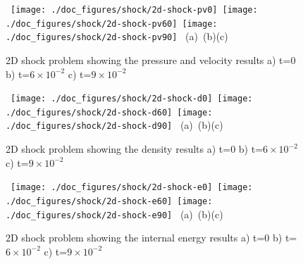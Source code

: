 \begin{figure}[H]
\vbox{
\hbox{
\hspace{-1.cm}
\texttt{[image: ./doc\_figures/shock/2d-shock-pv0]}
\hspace{-1.cm}
\texttt{[image: ./doc\_figures/shock/2d-shock-pv60]}
\hspace{-1.cm}
\texttt{[image: ./doc\_figures/shock/2d-shock-pv90]}
}
\vspace{-0.cm}
\hbox{\hspace{4.cm}(a) \hspace{4.5cm}(b)\hspace{4.5cm}(c)}
\vspace{-0.cm}}
\label{2d-pressure-vel}
\caption{ 2D shock problem showing the pressure and velocity results a) 
t=0 b) t=$6\times 10^{-2}$ c) t=$9\times 10^{-2}$ }
\end{figure}


\begin{figure}[H]
\vbox{
\hbox{
\hspace{-1.cm}
\texttt{[image: ./doc\_figures/shock/2d-shock-d0]}
\hspace{-1.cm}
\texttt{[image: ./doc\_figures/shock/2d-shock-d60]}
\hspace{-1.cm}
\texttt{[image: ./doc\_figures/shock/2d-shock-d90]}
}
\vspace{-0.cm}
\hbox{\hspace{4.cm}(a) \hspace{4.5cm}(b)\hspace{4.5cm}(c)}
\vspace{-0.cm}}
\label{2d-density-mesh}
\caption{ 2D shock problem showing the density results a) 
t=0 b) t=$6\times 10^{-2}$ c) t=$9\times 10^{-2}$ }
\end{figure}


\begin{figure}[H]
\vbox{
\hbox{
\hspace{-1.cm}
\texttt{[image: ./doc\_figures/shock/2d-shock-e0]}
\hspace{-1.cm}
\texttt{[image: ./doc\_figures/shock/2d-shock-e60]}
\hspace{-1.cm}
\texttt{[image: ./doc\_figures/shock/2d-shock-e90]}
}
\vspace{-0.cm}
\hbox{\hspace{4.cm}(a) \hspace{4.5cm}(b)\hspace{4.5cm}(c)}
\vspace{-0.cm}}
\label{2d-internal-energy-mesh}
\caption{ 2D shock problem showing the internal energy results a) 
t=0 b) t=$6\times 10^{-2}$ c) t=$9\times 10^{-2}$ }
\end{figure}



